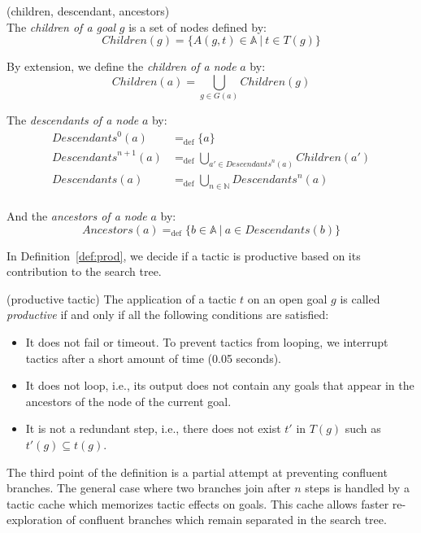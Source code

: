 \documentclass[runningheads,a4paper,draft]{svjour3}
\begin{document}
\begin{definition}\label{def:desc}(children, descendant, ancestors)\\
The \textit{children of a goal} $g$ is a set of nodes defined by:
\[\mathit{Children}(g) = \lbrace A(g,t)\in \mathbb{A}\ |\ t \in T(g) \rbrace\]

By extension, we define the \textit{children of a node} $a$ by:
\[\mathit{Children}(a) = \bigcup_{g \in G(a)} \mathit{Children}(g) \]

The \textit{descendants of a node} $a$ by:
\begin{align*}
\mathit{Descendants}^{0}(a) &=_{\mathrm{def}} \lbrace a \rbrace \\
\mathit{Descendants}^{n+1}(a) &=_{\mathrm{def}} \bigcup_{a' \in \mathit{Descendants}^{n}(a)}
\mathit{Children}(a') \\
\mathit{Descendants}(a) &=_{\mathrm{def}} \bigcup_{n \in \mathbb{N}} \mathit{Descendants}^n(a)\\
\end{align*}

And the \textit{ancestors of a node} $a$ by:
\[\mathit{Ancestors}(a) =_{\mathrm{def}} \lbrace b \in \mathbb{A} \ | \ a \in
Descendants(b) \rbrace\]
\end{definition}


In Definition~\ref{def:prod}, we decide if a tactic is productive based on its
contribution to the search tree.

\begin{definition}\label{def:prod} (productive tactic)
The application of a tactic $t$ on an open goal $g$ is called
\textit{productive} if and only if
all the following conditions are satisfied:
\begin{itemize}
\item It does not fail or timeout. To prevent tactics from looping, we
interrupt tactics after a short amount of time (0.05 seconds).
\item It does not loop, i.e., its output does not contain any goals that appear
in the ancestors of the node of the current goal.
\item It is not a redundant step, i.e., there does not exist $t'$ in $T(g)$
such as $t'(g) \subseteq t(g)$.
\end{itemize}

The third point of the definition is a partial attempt at preventing confluent
branches. The general case where two branches join after $n$ steps is handled
by a tactic cache which memorizes tactic effects on goals. This
cache allows faster re-exploration of confluent branches which remain
separated in the search tree.
\end{definition}
\end{document}

